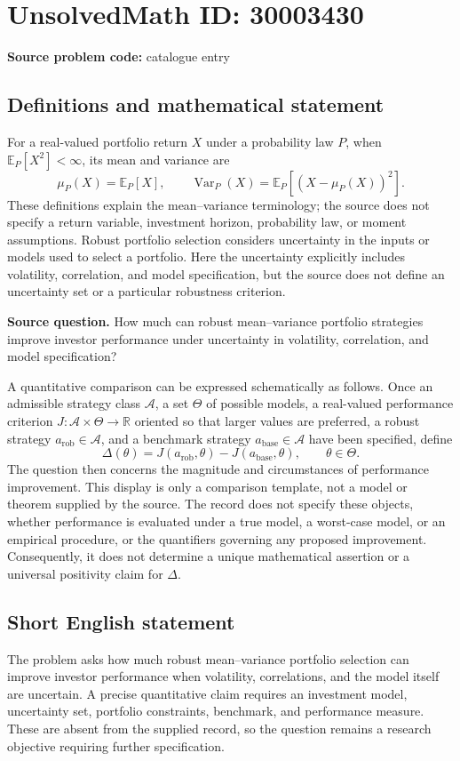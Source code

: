 \documentclass[11pt]{article}
\newcommand{\R}{\mathbb{R}}
\begin{document}
\section*{UnsolvedMath ID: 30003430}
\textbf{Source problem code:} catalogue entry
\subsection{Definitions and mathematical statement}
For a real-valued portfolio return \(X\) under a probability law \(P\), when \(\mathbb E_P[X^2]<\infty\), its mean and variance are
\[
\mu_P(X)=\mathbb E_P[X],\qquad
\operatorname{Var}_P(X)=\mathbb E_P\!\left[(X-\mu_P(X))^2\right].
\]
These definitions explain the mean--variance terminology; the source does not specify a return variable, investment horizon, probability law, or moment assumptions. Robust portfolio selection considers uncertainty in the inputs or models used to select a portfolio. Here the uncertainty explicitly includes volatility, correlation, and model specification, but the source does not define an uncertainty set or a particular robustness criterion.

\textbf{Source question.} How much can robust mean--variance portfolio strategies improve investor performance under uncertainty in volatility, correlation, and model specification?

A quantitative comparison can be expressed schematically as follows. Once an admissible strategy class \(\mathcal A\), a set \(\Theta\) of possible models, a real-valued performance criterion \(J:\mathcal A\times\Theta\to\R\) oriented so that larger values are preferred, a robust strategy \(a_{\mathrm{rob}}\in\mathcal A\), and a benchmark strategy \(a_{\mathrm{base}}\in\mathcal A\) have been specified, define
\[
\Delta(\theta)=J(a_{\mathrm{rob}},\theta)-J(a_{\mathrm{base}},\theta),\qquad \theta\in\Theta.
\]
The question then concerns the magnitude and circumstances of performance improvement. This display is only a comparison template, not a model or theorem supplied by the source. The record does not specify these objects, whether performance is evaluated under a true model, a worst-case model, or an empirical procedure, or the quantifiers governing any proposed improvement. Consequently, it does not determine a unique mathematical assertion or a universal positivity claim for \(\Delta\).
\subsection{Short English statement}
The problem asks how much robust mean--variance portfolio selection can improve investor performance when volatility, correlations, and the model itself are uncertain. A precise quantitative claim requires an investment model, uncertainty set, portfolio constraints, benchmark, and performance measure. These are absent from the supplied record, so the question remains a research objective requiring further specification.
\end{document}
